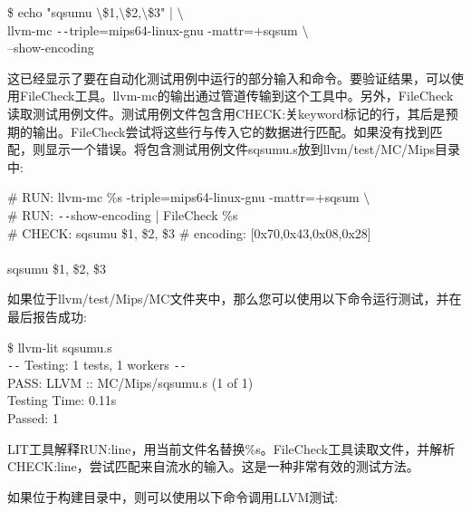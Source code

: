 \begin{tcolorbox}[colback=white,colframe=black]
\$ echo "sqsumu $\setminus$\$1,$\setminus$\$2,$\setminus$\$3" | $\setminus$ \\
\hspace*{0.5cm}llvm-mc \verb|--|triple=mips64-linux-gnu -mattr=+sqsum $\setminus$ \\
\hspace*{2.5cm}--show-encoding
\end{tcolorbox}

这已经显示了要在自动化测试用例中运行的部分输入和命令。要验证结果，可以使用FileCheck工具。llvm-mc的输出通过管道传输到这个工具中。另外，FileCheck读取测试用例文件。测试用例文件包含用CHECK:关keyword标记的行，其后是预期的输出。FileCheck尝试将这些行与传入它的数据进行匹配。如果没有找到匹配，则显示一个错误。将包含测试用例文件sqsumu.s放到llvm/test/MC/Mips目录中:\par

\begin{tcolorbox}[colback=white,colframe=black]
\# RUN: llvm-mc \%s -triple=mips64-linux-gnu -mattr=+sqsum $\setminus$ \\
\# RUN: \verb|--|show-encoding | FileCheck \%s \\
\# CHECK: sqsumu \$1, \$2, \$3 \# encoding: [0x70,0x43,0x08,0x28] \\
\\
\hspace*{1cm}sqsumu \$1, \$2, \$3
\end{tcolorbox}

如果位于llvm/test/Mips/MC文件夹中，那么您可以使用以下命令运行测试，并在最后报告成功:\par

\begin{tcolorbox}[colback=white,colframe=black]
\$ llvm-lit sqsumu.s \\
\verb|--| Testing: 1 tests, 1 workers \verb|--| \\
PASS: LLVM :: MC/Mips/sqsumu.s (1 of 1) \\
Testing Time: 0.11s \\
\hspace*{0.5cm}Passed: 1
\end{tcolorbox}

LIT工具解释RUN:line，用当前文件名替换\%s。FileCheck工具读取文件，并解析CHECK:line，尝试匹配来自流水的输入。这是一种非常有效的测试方法。\par

如果位于构建目录中，则可以使用以下命令调用LLVM测试:\par

